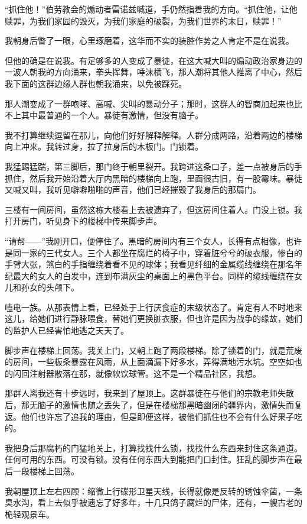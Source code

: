 \documentclass[AutoFakeBold=true]{book}
\begin{document}
``抓住他！''伯劳教会的煽动者雷诺兹喊道，手仍然指着我的方向。``抓住他，让他赎罪，为我们家园的毁灭，为我们家庭的破裂，为我们世界的末日，赎罪！''

我朝身后瞥了一眼，心里琢磨着，这华而不实的装腔作势之人肯定不是在说我。

但他的确是在说我。有足够多的人变成了暴徒，在这大喊大叫的煽动政治家身边的一波人朝我的方向涌来，拳头挥舞，唾沫横飞，那人潮将其他人推离了中心，然后我下面的这群边缘人群也朝我涌来，以免被踩死。

那人潮变成了一群咆哮、高喊、尖叫的暴动分子；那时，这群人的智商加起来也比不上其中最普通的一个人。暴徒有激情，但没有脑子。

我不打算继续逗留在那儿，向他们好好解释解释。人群分成两路，沿着两边的楼梯向上冲来。我转过身，拉了拉身后的木板门。门锁着。

我猛踢猛踹，第三脚后，那门终于朝里裂开。我跨进这条口子，差一点被身后的手抓住，然后我开始沿着大厅内黑暗的楼梯向上跑，里面很古旧，有一股霉味。暴徒又喊又叫，我听见噼噼啪啪的声音，他们已经摧毁了我身后的那扇门。

三楼有一间房间，虽然这栋大楼看上去被遗弃了，但这房间住着人。门没上锁。我打开房门，听见身下的楼梯中传来脚步声。

``请帮——''我刚开口，便停住了。黑暗的房间内有三个女人，长得有点相像，也许是同一家的三代女人。三个人都坐在腐烂的椅子中，穿着脏兮兮的破衣服，惨白的手臂大张，煞白的手指缠绕着看不见的球体；我看见纤细的金属缆线缠绕在那名年纪最大的女人的白发中，连到布满灰尘的桌面上的黑色平台。同样的缆线缠绕在女儿和孙女的头颅下。

嗑电一族。从那表情上看，已经处于上行厌食症的末级状态了。肯定有人不时地来这儿，给她们进行静脉喂食，替她们更换脏衣服，但也许是因为战争的缘故，她们的监护人已经害怕地逃之天天了。

脚步声在楼梯上回荡。我关上门，又朝上跑了两段楼梯。除了锁着的门，就是荒废的房间，一些板条暴露在风雨，从上面滴漏下好多水，弄得满地污水坑。空空如也的闪回注射器散落在那，就像软饮球管。{\kaishu 这不是一个精品社区，}我想。

那群人离我还有十步远时，我来到了屋顶上。这群暴徒在与他们的宗教老师失散后，那无脑子的激情也随之丢失了，但是在楼梯那黑暗幽闭的疆界内，激情失而复返。他们也许忘了追我的理由，但是即便这样，被他们抓住也不会有什么好果子吃的。

我把身后那腐朽的门猛地关上，打算找找什么锁，找找什么东西来封住这条通道。任何可用的东西。可没有锁。没有任何东西大到能把门口封住。狂乱的脚步声在最后一段楼梯上回荡。

我朝屋顶上左右四顾：缩微上行碟形卫星天线，长得就像是反转的锈蚀伞菌，一条臭水沟，看上去似乎被遗忘了好多年，十几只鸽子腐烂的尸体，还有，一艘古老的桅轻观景车。
\end{document}
